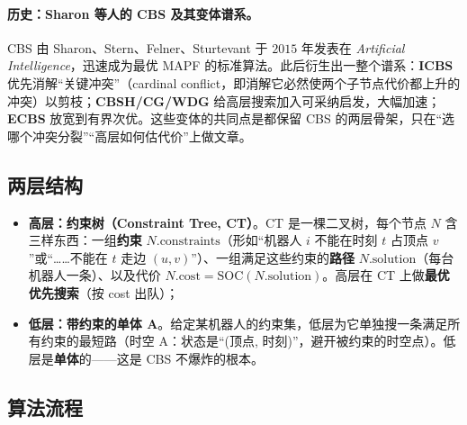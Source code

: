 \paragraph{历史：Sharon 等人的 CBS 及其变体谱系。}
CBS 由 Sharon、Stern、Felner、Sturtevant 于 $2015$ 年发表在 \emph{Artificial Intelligence}\cite{sharon2015cbs}，迅速成为最优 MAPF 的标准算法。此后衍生出一整个谱系：\textbf{ICBS}\cite{boyarski2015icbs} 优先消解“关键冲突”（cardinal conflict，即消解它必然使两个子节点代价都上升的冲突）以剪枝；\textbf{CBSH/CG/WDG}\cite{felner2018adding,li2019cbsh} 给高层搜索加入可采纳启发，大幅加速；\textbf{ECBS}\cite{barer2014ecbs} 放宽到有界次优。这些变体的共同点是都保留 CBS 的两层骨架，只在“选哪个冲突分裂”“高层如何估代价”上做文章。

\subsection{两层结构}
\label{sec:mapf-cbs-twolayer}

\begin{definition}\label{def:mapf-cbs-layers}
\begin{itemize}
  \item \textbf{高层：约束树（Constraint Tree, CT）}。CT 是一棵二叉树，每个节点 $N$ 含三样东西：一组\textbf{约束} $N.\mathrm{constraints}$（形如“机器人 $i$ 不能在时刻 $t$ 占顶点 $v$”或“……不能在 $t$ 走边 $(u,v)$”）、一组满足这些约束的\textbf{路径} $N.\mathrm{solution}$（每台机器人一条）、以及代价 $N.\mathrm{cost}=\mathrm{SOC}(N.\mathrm{solution})$。高层在 CT 上做\textbf{最优优先搜索}（按 cost 出队）；
  \item \textbf{低层：带约束的单体 A\*}。给定某机器人的约束集，低层为它单独搜一条满足所有约束的最短路（时空 A\*：状态是“(顶点, 时刻)”，避开被约束的时空点）。低层是\textbf{单体}的——这是 CBS 不爆炸的根本。
\end{itemize}
\end{definition}

\subsection{算法流程}
\label{sec:mapf-cbs-algo}

